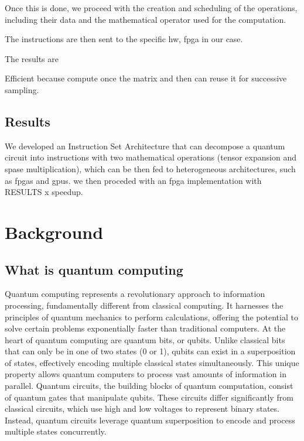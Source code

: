 \documentclass[12pt,oneside,a4paper]{article}
\begin{document}
Once this is done, we proceed with the creation and scheduling of the operations, including their data and the mathematical operator used for the computation.

The instructions are then sent to the specific hw, fpga in our case.

The results are

Efficient because compute once the matrix and then can reuse it for successive sampling.

\subsection{Results}
We developed an Instruction Set Architecture that can decompose a quantum circuit into instructions with two mathematical operations (tensor expansion and spase multiplication), which can be then fed to heterogeneous architectures, such as fpgas and gpus. we then proceded with an fpga implementation with RESULTS x speedup.



\section{Background}

\subsection{What is quantum computing}
Quantum computing represents a revolutionary approach to information processing, fundamentally different from classical computing. It harnesses the principles of quantum mechanics to perform calculations, offering the potential to solve certain problems exponentially faster than traditional computers.
At the heart of quantum computing are quantum bits, or qubits. Unlike classical bits that can only be in one of two states (0 or 1), qubits can exist in a superposition of states, effectively encoding multiple classical states simultaneously. This unique property allows quantum computers to process vast amounts of information in parallel.
Quantum circuits, the building blocks of quantum computation, consist of quantum gates that manipulate qubits. These circuits differ significantly from classical circuits, which use high and low voltages to represent binary states. Instead, quantum circuits leverage quantum superposition to encode and process multiple states concurrently.
\end{document}

